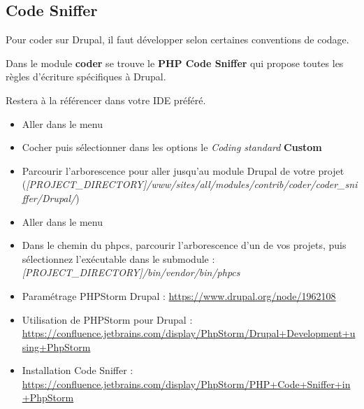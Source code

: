 \documentclass[a4paper,11pt,french]{rtdsphinxmanual}
\begin{document}
\subsection{Code Sniffer}
\label{poste_travail:code-sniffer}
Pour coder sur Drupal, il faut développer selon certaines conventions de codage.

Dans le module \textbf{coder} se trouve le \textbf{PHP Code Sniffer} qui propose toutes les règles d'écriture spécifiques à Drupal.

Restera à la référencer dans votre IDE préféré.
\begin{itemize}
\item {} 
Aller dans le menu 

\item {} 
Cocher  puis sélectionner dans les options le \emph{Coding standard} \textbf{Custom}

\item {} 
Parcourir l'arborescence pour aller jusqu'au module Drupal  de votre projet (\emph{{[}PROJECT\_DIRECTORY{]}/www/sites/all/modules/contrib/coder/coder\_sniffer/Drupal/})

\item {} 
Aller dans le menu 

\item {} 
Dans le chemin du phpcs, parcourir l'arborescence d'un de vos projets, puis sélectionnez l'exécutable dans le submodule : \emph{{[}PROJECT\_DIRECTORY{]}/bin/vendor/bin/phpcs}

\end{itemize}



\begin{itemize}
\item {} 
Paramétrage PHPStorm Drupal : \href{https://www.drupal.org/node/1962108}{https://www.drupal.org/node/1962108}

\item {} 
Utilisation de PHPStorm pour Drupal : \href{https://confluence.jetbrains.com/display/PhpStorm/Drupal+Development+using+PhpStorm}{https://confluence.jetbrains.com/display/PhpStorm/Drupal+Development+using+PhpStorm}

\item {} 
Installation Code Sniffer : \href{https://confluence.jetbrains.com/display/PhpStorm/PHP+Code+Sniffer+in+PhpStorm}{https://confluence.jetbrains.com/display/PhpStorm/PHP+Code+Sniffer+in+PhpStorm}

\end{itemize}
\end{document}
